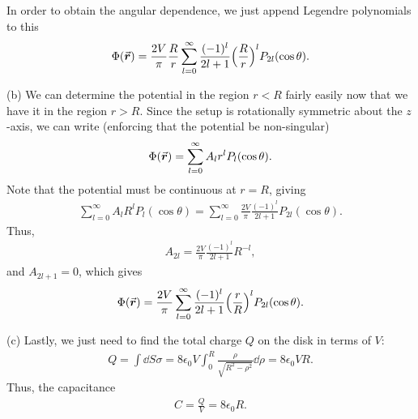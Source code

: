{In order to obtain the angular dependence, we just append Legendre polynomials to this
\begin{eqnarray}
    \Phi(\va*{r}) = \frac{2 V}{\pi} \frac{R}{r} \sum_{l=0}^{\infty} \frac{(-1)^{l}}{2l+1} \Big( \frac{R}{r} \Big)^{l} P_{2l}(\cos{\theta})
.\end{eqnarray}

(b) We can determine the potential in the region $r < R$ fairly easily now that we have it in the region $r > R$.
Since the setup is rotationally symmetric about the $z$-axis, we can write (enforcing that the potential be non-singular)
\begin{eqnarray}
    \Phi(\va*{r}) = \sum_{l=0}^{\infty} A_{l} r^{l} P_{l}(\cos{\theta})
.\end{eqnarray}
Note that the potential must be continuous at $r = R$, giving
\begin{eqnarray}
    \sum_{l=0}^{\infty} A_{l} R^{l} P_{l}(\cos{\theta}) = \sum_{l=0}^{\infty} \frac{2 V}{\pi} \frac{(-1)^{l}}{2l+1} P_{2l}(\cos{\theta})
.\end{eqnarray}
Thus,
\begin{eqnarray}
    A_{2l} = \frac{2 V}{\pi} \frac{(-1)^{l}}{2l+1} R^{-l}
,\end{eqnarray}
and $A_{2l+1} = 0$, which gives
\begin{eqnarray}
    \Phi(\va*{r}) = \frac{2 V}{\pi} \sum_{l=0}^{\infty} \frac{(-1)^{l}}{2l+1} \Big( \frac{r}{R} \Big)^{l} P_{2l}(\cos{\theta})
.\end{eqnarray}

(c) Lastly, we just need to find the total charge $Q$ on the disk in terms of $V$:
\begin{eqnarray}
    Q = \int \dd{S} \sigma = 8 \epsilon_0 V \int_{0}^{R} \frac{\rho}{\sqrt{R^2 - \rho^2}} \dd{\rho} = 8 \epsilon_0 V R
.\end{eqnarray}
Thus, the capacitance 
\begin{eqnarray}
    C = \frac{Q}{V} = 8 \epsilon_0 R
.\end{eqnarray}

}

